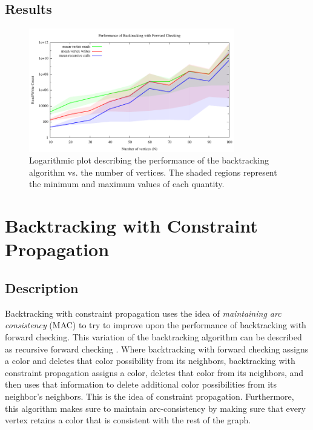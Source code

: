 \documentclass{article}
\begin{document}
	\subsection{Results}
	
		\begin{figure}[h!]
			\centering
			\includegraphics[width=0.8\textwidth]{../results_5/backtracking_forward/bt_forward_performance}
			\caption{Logarithmic plot describing the performance of the backtracking algorithm vs. the number of vertices. The shaded regions represent the minimum and maximum values of each quantity.}
		\end{figure}
	
\section{Backtracking with Constraint Propagation}

	\subsection{Description}
	
		Backtracking with constraint propagation uses the idea of \textit{maintaining arc consistency} (MAC) to try to improve upon the performance of backtracking with forward checking. This variation of the backtracking algorithm can be described as recursive forward checking \cite{ai}. Where backtracking with forward checking assigns a color and deletes that color possibility from its neighbors, backtracking with constraint propagation assigns a color, deletes that color from its neighbors, and then uses that information to delete additional color possibilities from its neighbor's neighbors. This is the idea of constraint propagation. Furthermore, this algorithm makes sure to maintain arc-consistency by making sure that every vertex retains a color that is consistent with the rest of the graph.
	
\end{document}
